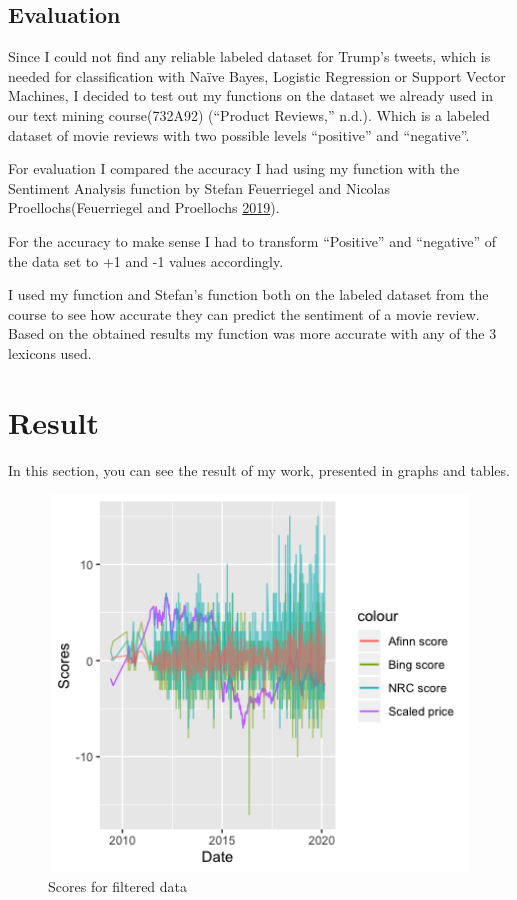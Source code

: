 \documentclass[]{article}
\begin{document}
\subsection{Evaluation}\label{evaluation}

Since I could not find any reliable labeled dataset for Trump's tweets,
which is needed for classification with Naïve Bayes, Logistic Regression
or Support Vector Machines, I decided to test out my functions on the
dataset we already used in our text mining course(732A92) (``Product
Reviews,'' n.d.). Which is a labeled dataset of movie reviews with two
possible levels ``positive'' and ``negative''.

For evaluation I compared the accuracy I had using my function with the
Sentiment Analysis function by Stefan Feuerriegel and Nicolas
Proellochs(Feuerriegel and Proellochs
\protect\hyperlink{ref-feuerriegel_sentimentanalysis_2019}{2019}).

For the accuracy to make sense I had to transform ``Positive'' and
``negative'' of the data set to +1 and -1 values accordingly.

I used my function and Stefan's function both on the labeled dataset
from the course to see how accurate they can predict the sentiment of a
movie review. Based on the obtained results my function was more
accurate with any of the 3 lexicons used.

\section{Result}\label{result}

In this section, you can see the result of my work, presented in graphs
and tables.

\begin{figure}
\includegraphics[width=15cm,
  height=10cm,
  keepaspectratio]{filtered}
\centering 
\caption{Scores for filtered data}\label{Figure3}
\end{figure}
\end{document}
